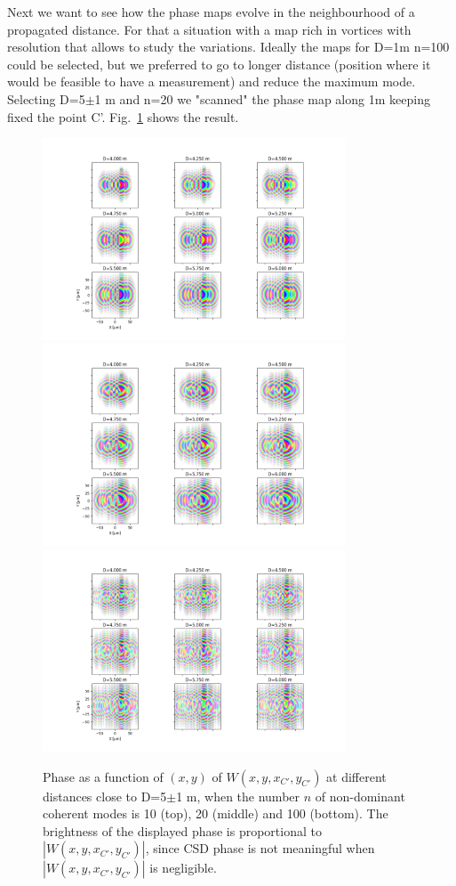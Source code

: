 \documentclass{iucr}              %
\begin{document}
Next we want to see how the phase maps evolve in the neighbourhood of a propagated distance. For that a situation with a map rich in vortices with resolution that allows to study the variations. Ideally the maps for D=1m n=100 could be selected, but we preferred to go to longer distance (position where it would be feasible to have a measurement) and reduce the maximum mode. Selecting D=5$\pm$1 m and n=20 we "scanned" the phase map along 1m keeping fixed the point C'. Fig.~\ref{neighbour} shows the result. 


\begin{figure}
\caption{Phase as a function of $(x,y)$ of $W(x,y,x_{C'},y_{C'})$ at different distances close to D=5$\pm$1 m, when the number $n$ of non-dominant coherent modes is 10 (top), 20 (middle) and 100 (bottom). The brightness of the displayed phase is proportional to $|W(x,y,x_{C'},y_{C'})|$, since CSD phase is not meaningful when $|W(x,y,x_{C'},y_{C'})|$ is negligible.}
\includegraphics[width=9cm]{Figures/vx_id16a_C5_propagated_neighbour_mode0009.png}
\includegraphics[width=9cm]{Figures/vx_id16a_C5_propagated_neighbour_mode0019.png}
\includegraphics[width=9cm]{Figures/vx_id16a_C5_propagated_neighbour_mode0099.png}
\label{neighbour}
\end{figure}
\end{document}

